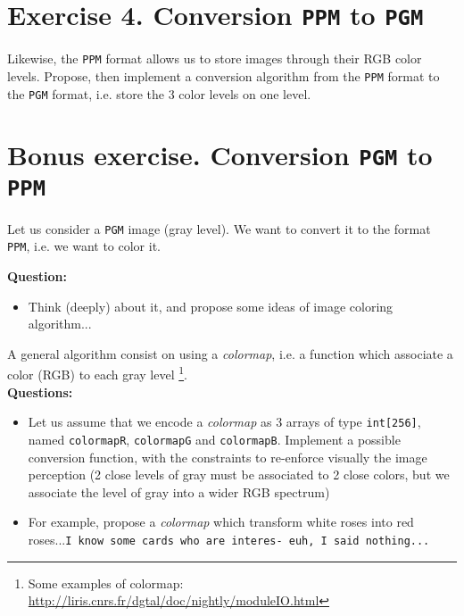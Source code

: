 \documentclass[a4paper, 11pt, english]{article}
\begin{document}
\section*{\bf Exercise 4. \rm Conversion \texttt{PPM} to \texttt{PGM}}

\par Likewise, the \texttt{PPM} format allows us to store images through their RGB color levels. Propose, then implement a conversion algorithm from the \texttt{PPM} format to the \texttt{PGM} format, i.e. store the 3 color levels on one level.


\section*{\bf Bonus exercise. \rm Conversion \texttt{PGM} to \texttt{PPM}}

\par Let us consider a \texttt{PGM} image (gray level). We want to convert it to the format \texttt{PPM}, i.e. we want to color it.

\smallskip
\noindent \textbf{Question:}
\begin{itemize}
	\item Think (deeply) about it, and propose some ideas of image coloring algorithm...
\end{itemize}

\par A general algorithm consist on using a \emph{colormap}, i.e. a function which associate a color (RGB) to each gray level \footnote{Some examples of colormap: \url{http://liris.cnrs.fr/dgtal/doc/nightly/moduleIO.html}}.\\

\smallskip
\noindent \textbf{Questions:}
\begin{itemize}
	\item Let us assume that we encode a \emph{colormap} as 3 arrays of type \texttt{int[256]}, named \texttt{colormapR}, \texttt{colormapG} and \texttt{colormapB}. Implement a possible conversion function, with the constraints to re-enforce visually the image perception (2 close levels of gray must be associated to 2 close colors, but we associate the level of gray into a wider RGB spectrum)
	
	\item For example, propose a \emph{colormap} which transform white roses into red roses...\texttt{I know some cards who are interes- euh, I said nothing...}
\end{itemize}
\end{document}
